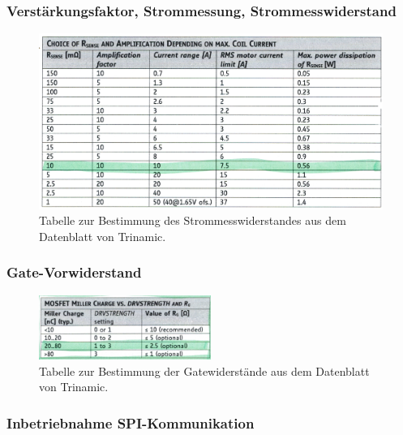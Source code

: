 \subsubsection{Verstärkungsfaktor, Strommessung, Strommesswiderstand}\label{Appendix:Shunt}

\begin{figure}[H]
	\centering
	\includegraphics[width=\textwidth]{graphics/Tabelle_Shunts.png}
	\caption{Tabelle zur Bestimmung des Strommesswiderstandes aus dem Datenblatt von Trinamic.\cite[S.31]{trinamicmotion_control_gmbh__co_kg_tmc6200_2019}}
	\label{fig:Tabelle_Shunts}
\end{figure}

\subsubsection{Gate-Vorwiderstand}\label{Appendix:Gate_Vorwiderstand}

\begin{figure}[H]
	\centering
	\includegraphics[width=0.5\textwidth]{graphics/Tabelle_Gatewiderstaende.png}
	\caption{Tabelle zur Bestimmung der Gatewiderstände aus dem Datenblatt von Trinamic.\cite[S.13]{trinamicmotion_control_gmbh__co_kg_tmc6200_2019}}
	\label{fig:Tabelle_Gatewiderstaende}
\end{figure}

\subsubsection{Inbetriebnahme SPI-Kommunikation}\label{Appendix:TMC6200_SPI}

